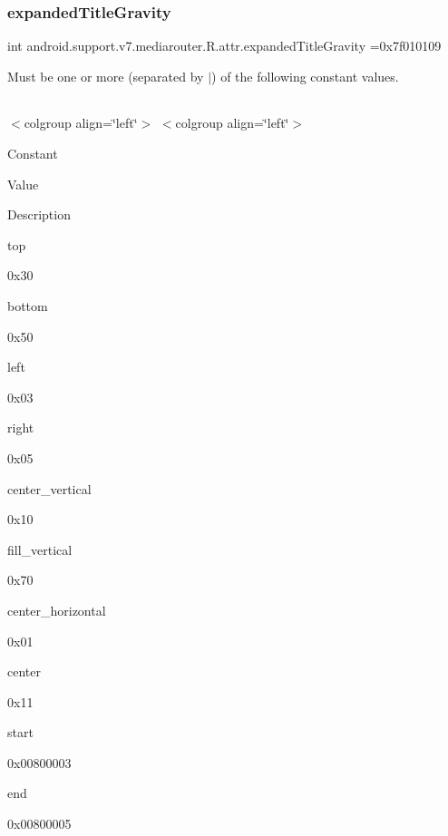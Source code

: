 \subsubsection{\texorpdfstring{expanded\+Title\+Gravity}{expandedTitleGravity}}
{\footnotesize\ttfamily int android.\+support.\+v7.\+mediarouter.\+R.\+attr.\+expanded\+Title\+Gravity =0x7f010109\hspace{0.3cm}{\ttfamily [static]}}

Must be one or more (separated by \textquotesingle{}$\vert$\textquotesingle{}) of the following constant values.

\tabulinesep=1mm
\begin{longtabu} spread 0pt [c]{*{0}{|X[-1]}|}
\hline
\end{longtabu}
$<$colgroup align=\char`\"{}left\char`\"{}$>$ $<$colgroup align=\char`\"{}left\char`\"{}$>$ 

Constant

Value

Description 

{\ttfamily top}

0x30

{\ttfamily bottom}

0x50

{\ttfamily left}

0x03

{\ttfamily right}

0x05

{\ttfamily center\+\_\+vertical}

0x10

{\ttfamily fill\+\_\+vertical}

0x70

{\ttfamily center\+\_\+horizontal}

0x01

{\ttfamily center}

0x11

{\ttfamily start}

0x00800003

{\ttfamily end}

0x00800005\mbox{\label{classandroid_1_1support_1_1v7_1_1mediarouter_1_1R_1_1attr_a094d5abacdb04db8db3be458fef1e774}} 
